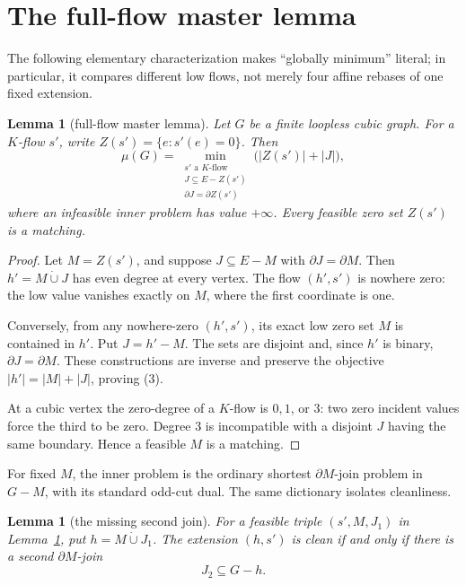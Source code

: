 \documentclass[11pt]{article}
\newtheorem{lemma}[theorem]{Lemma}
\theoremstyle{definition}
\theoremstyle{remark}
\newcommand{\bd}{\partial}
\newcommand{\dotcupx}{\mathbin{\dot\cup}}
\begin{document}
\section{The full-flow master lemma}

The following elementary characterization makes ``globally minimum''
literal; in particular, it compares different low flows, not merely
four affine rebases of one fixed extension.

\begin{lemma}[full-flow master lemma]\label{lem:master}
Let \(G\) be a finite loopless cubic graph.  For a \(K\)-flow \(s'\),
write \(Z(s')=\{e:s'(e)=0\}\).  Then
\[
 \mu(G)=
 \min_{\substack{s'\text{ a }K\text{-flow}\\
                  J\subseteq E-Z(s')\\
                  \bd J=\bd Z(s')}}
       \bigl(|Z(s')|+|J|\bigr),                            \tag{3}
\]
where an infeasible inner problem has value \(+\infty\).
Every feasible zero set \(Z(s')\) is a matching.
\end{lemma}

\begin{proof}
Let \(M=Z(s')\), and suppose
\(J\subseteq E-M\) with \(\bd J=\bd M\).  Then
\(h'=M\dotcupx J\) has even degree at every vertex.  The flow
\((h',s')\) is nowhere zero: the low value vanishes exactly on \(M\),
where the first coordinate is one.

Conversely, from any nowhere-zero \((h',s')\), its exact low zero set
\(M\) is contained in \(h'\).  Put \(J=h'-M\).  The sets are disjoint
and, since \(h'\) is binary, \(\bd J=\bd M\).  These constructions are
inverse and preserve the objective \(|h'|=|M|+|J|\), proving (3).

At a cubic vertex the zero-degree of a \(K\)-flow is \(0,1\), or \(3\):
two zero incident values force the third to be zero.  Degree \(3\) is
incompatible with a disjoint \(J\) having the same boundary.  Hence a
feasible \(M\) is a matching.
\end{proof}

For fixed \(M\), the inner problem is the ordinary shortest
\(\bd M\)-join problem in \(G-M\), with its standard odd-cut dual.  The
same dictionary isolates cleanliness.

\begin{lemma}[the missing second join]\label{lem:cleanjoin}
For a feasible triple \((s',M,J_1)\) in Lemma~\ref{lem:master}, put
\(h=M\dotcupx J_1\).  The extension \((h,s')\) is clean if and only if
there is a second \(\bd M\)-join
\[
                          J_2\subseteq G-h.                \tag{4}
\]
\end{lemma}
\end{document}
